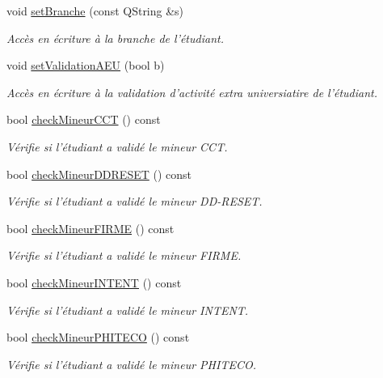 \begin{DoxyCompactItemize}
void \hyperlink{class_dossier_aed577cc66b49b8ca8d362f24f45688e0}{set\-Branche} (const Q\-String \&s)
\begin{DoxyCompactList}\small\item\em Accès en écriture à la branche de l'étudiant. \end{DoxyCompactList}\item 
void \hyperlink{class_dossier_a0c0c7bdfa3a4cb8639cbaaaa4730ad96}{set\-Validation\-A\-E\-U} (bool b)
\begin{DoxyCompactList}\small\item\em Accès en écriture à la validation d'activité extra universiatire de l'étudiant. \end{DoxyCompactList}\item 
bool \hyperlink{class_dossier_aa6c9b60422b039741017fb47be117c68}{check\-Mineur\-C\-C\-T} () const 
\begin{DoxyCompactList}\small\item\em Vérifie si l'étudiant a validé le mineur C\-C\-T. \end{DoxyCompactList}\item 
bool \hyperlink{class_dossier_abdac9bb5e0dda2922188d1b2eaeef512}{check\-Mineur\-D\-D\-R\-E\-S\-E\-T} () const 
\begin{DoxyCompactList}\small\item\em Vérifie si l'étudiant a validé le mineur D\-D-\/\-R\-E\-S\-E\-T. \end{DoxyCompactList}\item 
bool \hyperlink{class_dossier_afff6564a0f1ed856dd10029f02a20e72}{check\-Mineur\-F\-I\-R\-M\-E} () const 
\begin{DoxyCompactList}\small\item\em Vérifie si l'étudiant a validé le mineur F\-I\-R\-M\-E. \end{DoxyCompactList}\item 
bool \hyperlink{class_dossier_a8e25d35b689637c3d5f1a23bdf5d1dff}{check\-Mineur\-I\-N\-T\-E\-N\-T} () const 
\begin{DoxyCompactList}\small\item\em Vérifie si l'étudiant a validé le mineur I\-N\-T\-E\-N\-T. \end{DoxyCompactList}\item 
bool \hyperlink{class_dossier_acaaaaae68efbb84e0cbc49b9de57e0d0}{check\-Mineur\-P\-H\-I\-T\-E\-C\-O} () const 
\begin{DoxyCompactList}\small\item\em Vérifie si l'étudiant a validé le mineur P\-H\-I\-T\-E\-C\-O. \end{DoxyCompactList}\item 

\end{DoxyCompactItemize}
